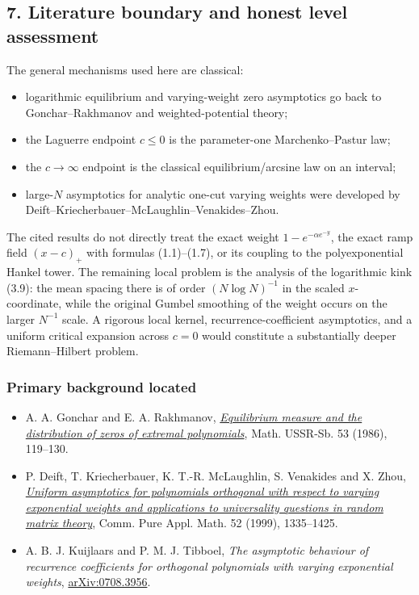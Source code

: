 \subsection{7. Literature boundary and honest level assessment}

The general mechanisms used here are classical:

\begin{itemize}
\tightlist
\item
  logarithmic equilibrium and varying-weight zero asymptotics go back to
  Gonchar--Rakhmanov and weighted-potential theory;
\item
  the Laguerre endpoint \(c\le0\) is the parameter-one
  Marchenko--Pastur law;
\item
  the \(c\to\infty\) endpoint is the classical equilibrium/arcsine law on
  an interval;
\item
  large-\(N\) asymptotics for analytic one-cut varying weights were
  developed by Deift--Kriecherbauer--McLaughlin--Venakides--Zhou.
\end{itemize}

The cited results do not directly treat the exact weight
\(1-e^{-\alpha e^{-y}}\), the exact ramp field \((x-c)_+\) with formulas
(1.1)--(1.7), or its coupling to the polyexponential Hankel tower.  The
remaining local problem is the analysis of the logarithmic kink (3.9): the
mean spacing there is of
order \((N\log N)^{-1}\) in the scaled \(x\)-coordinate, while the original
Gumbel smoothing of the weight occurs on the larger \(N^{-1}\) scale.
A rigorous local kernel, recurrence-coefficient asymptotics, and a uniform
critical expansion across \(c=0\) would constitute a substantially deeper
Riemann--Hilbert problem.

\subsubsection{Primary background located}

\begin{itemize}
\tightlist
\item
  A. A. Gonchar and E. A. Rakhmanov, \href{https://ui.adsabs.harvard.edu/abs/1986SbMat..53..119G}{\emph{Equilibrium measure and the
  distribution of zeros of extremal polynomials}},
  Math. USSR-Sb. 53 (1986), 119--130.
\item
  P. Deift, T. Kriecherbauer, K. T.-R. McLaughlin, S. Venakides and
  X. Zhou, \href{https://doi.org/10.1002/(SICI)1097-0312(199911)52:11\%3C1335::AID-CPA1\%3E3.0.CO;2-1}{\emph{Uniform asymptotics for polynomials orthogonal with respect to
  varying exponential weights and applications to universality questions
  in random matrix theory}},
  Comm. Pure Appl. Math. 52 (1999), 1335--1425.
\item
  A. B. J. Kuijlaars and P. M. J. Tibboel, \emph{The asymptotic behaviour of
  recurrence coefficients for orthogonal polynomials with varying
  exponential weights}, \href{https://arxiv.org/abs/0708.3956}{arXiv:0708.3956}.
\end{itemize}
